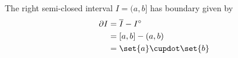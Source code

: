 \documentclass{article} %
\newcommand{\interior}[1]{{#1}^\circ}
\begin{document}
\begin{example}{} The right semi-closed interval $I=(a,b]$ has boundary given by
\begin{align*}
\partial I &= \overline{I} - \interior{I} \\
&= [a,b] - (a,b) \\
& = \set{a} \cupdot \set{b}
\end{align*}
%
\label{ex:boundary_of_rsc_interval}	
\end{example}
\end{document}
